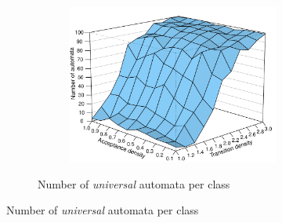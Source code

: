 \begin{figure}[htb!]
 \begin{subfigure}{\textwidth}
    \begin{subtable}{0.47\textwidth}
    
    \end{subtable}
    \hfill
    \begin{subfigure}{0.52\textwidth}
    \includegraphics[width=\textwidth]{../results/figures/testset/univ.persp.pdf}
    \end{subfigure}
  \caption{Number of \textit{universal} automata per class}
  \end{subfigure}


\end{figure}
